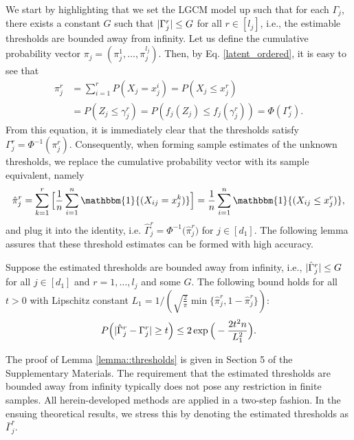 We start by highlighting that we set the LGCM model up such that for each $\Gamma_j$, there exists a constant $G$ such that $\lvert\Gamma^r_j\rvert \leq G$ for all $r \in [l_{j}]$, i.e., the estimable thresholds are bounded away from infinity. Let us define the cumulative probability vector $\pi_j = (\pi^1_j, \dots, \pi^{l_{j}}_j)$. Then, by Eq. \eqref{latent_ordered}, it is easy to see that
\begin{equation}\label{thresholds_identity}
    \begin{split}
        \pi^r_j &= \sum_{i=1}^r P(X_j = x^i_j) = P(X_j \leq x^r_j) \\
        &= P(Z_j \leq \gamma_j^r) = P(f_j(Z_j) \leq f_j(\gamma_j^r)) = \Phi(\Gamma^r_j).
    \end{split}
\end{equation}
From this equation, it is immediately clear that the thresholds satisfy $\Gamma^{r}_{j} = \Phi^{-1}( \pi^r_j )$.
Consequently, when forming sample estimates of the unknown thresholds, we replace the cumulative probability vector with its sample equivalent, namely
\begin{equation}
    \hat\pi^r_j = \sum_{k=1}^r \Big[\frac{1}{n} \sum_{i=1}^n \mathbbm{1}{(X_{ij} = x^k_j)}\Big] = \frac{1}{n} \sum_{i=1}^n \mathbbm{1}{(X_{ij} \leq x^r_j)},
\end{equation}
and plug it into the identity, i.e. $\hat\Gamma^r_j = \Phi^{-1}\big( \hat\pi^r_j \big)$ for $j \in [d_1]$. The following lemma assures that these threshold estimates can be formed with high accuracy.
\begin{lemma}\label{lemma::thresholds}
    Suppose the estimated thresholds are bounded away from infinity, i.e., \(\lvert\hat\Gamma^r_j\rvert \leq G\) for all $j \in [d_1]$ and $r = 1, \dots, l_j$ and some \(G\). The following bound holds for all $t > 0$ with Lipschitz constant \(L_1 = 1/(\sqrt{\frac{2}{\pi}} \min\{\hat\pi^r_j, 1- \hat\pi^r_j\})\):
    \begin{equation*}
        P\Big(\Abs{\hat\Gamma_j^r - \Gamma_j^r} \geq t \Big) \leq 2\exp{\Big(- \frac{2t^2n}{L_1^2}\Big)}.
    \end{equation*}
\end{lemma}

The proof of Lemma \ref{lemma::thresholds} is given in Section 5 %
of the Supplementary Materials. The requirement that the estimated thresholds are bounded away from infinity typically does not pose any restriction in finite samples. All herein-developed methods are applied in a two-step fashion. In the ensuing theoretical results, we stress this by denoting the estimated thresholds as $\bar{\Gamma}_j^r$.

